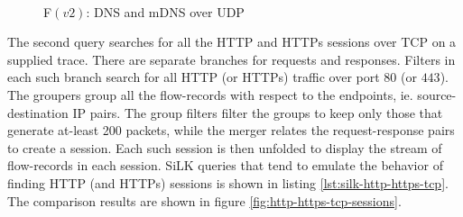 \begin{figure}[ht!]
\centering
{}\quad
{}\\
\caption{F$(v2)$: DNS and mDNS over UDP}
\label{fig:dns-mdns-udp}
\end{figure}


The second query searches for all the HTTP and HTTPs sessions over TCP on a
supplied trace. There are separate branches for requests and responses.
Filters in each such branch search for all HTTP (or HTTPs) traffic over port
$80$ (or $443$). The groupers group all the flow-records with respect to the
endpoints, ie. source-destination IP pairs. The group  filters filter the groups to keep only those that
generate at-least 200 packets, while the merger relates the request-response
pairs to create a session. Each such session is then unfolded to display the
stream of flow-records in each session. SiLK queries that tend to emulate the
behavior of finding HTTP (and HTTPs) sessions is shown in listing
\ref{lst:silk-http-https-tcp}. The comparison results are shown in figure
\ref{fig:http-https-tcp-sessions}.


